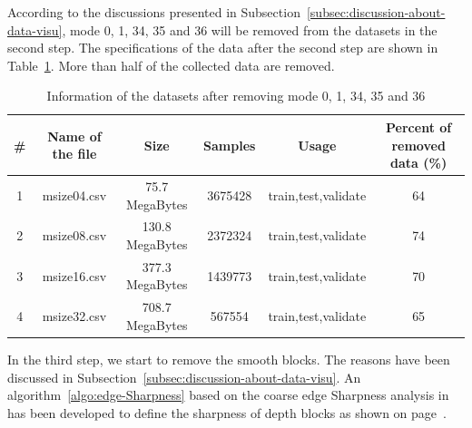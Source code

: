 According to the discussions presented in 
Subsection~\ref{subsec:discussion-about-data-visu},
mode 0, 1, 34, 35 and 36 will be removed from 
the datasets in the second step.
The specifications of the data after the second step
are shown in Table~\ref{tab:datasets-after-second-step}.
More than half of the collected data are removed.
\begin{table}[H]
    \caption{Information of the datasets after removing mode 0, 1, 34, 35 and 36}
    \bigskip\label{tab:datasets-after-second-step}
    \centering
    \begin{tabular}{c c c c c c}
        \toprule
        \# & Name of the file & Size & Samples & Usage & Percent of removed data (\%) \\
        \midrule
        1 & msize04.csv & 75.7 MegaBytes & 3675428 & train,test,validate & 64 \\
        2 & msize08.csv & 130.8 MegaBytes & 2372324 & train,test,validate & 74 \\
        3 & msize16.csv & 377.3 MegaBytes & 1439773 & train,test,validate & 70 \\
        4 & msize32.csv & 708.7 MegaBytes & 567554 & train,test,validate & 65 \\
        \bottomrule
    \end{tabular}
\end{table}
In the third step, we start to remove the smooth blocks.
The reasons have been discussed in 
Subsection~\ref{subsec:discussion-about-data-visu}.
An algorithm~\ref{algo:edge-Sharpness}
based on the coarse edge Sharpness analysis
in~\parencite{RN78} has been developed to define the
sharpness of depth blocks as shown 
on page~\pageref{algo:edge-Sharpness}.

